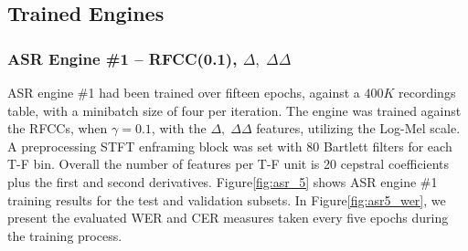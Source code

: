 

\subsection{Trained Engines}
\subsubsection{ASR Engine \#1 -- RFCC(0.1), \(\Delta,\;\Delta\Delta\)}
ASR engine \#1 had been trained over fifteen epochs,
against a \(400K\) recordings table, with a minibatch size 
of four per iteration. 
The engine was trained against the RFCCs, 
when \(\gamma=0.1\),
with the \(\Delta,\;\Delta\Delta\) features, utilizing
the Log-Mel scale. A preprocessing STFT enframing
block was set with
80 Bartlett filters for each T-F bin.
Overall the number of features
per T-F unit is 20 cepstral coefficients plus the
first and second derivatives.
Figure\;\ref{fig:asr_5} shows ASR engine \#1 training results
for the test and validation subsets.
In Figure\;\ref{fig:asr5_wer},
we present the evaluated WER and CER measures
taken every five epochs during the training process.

